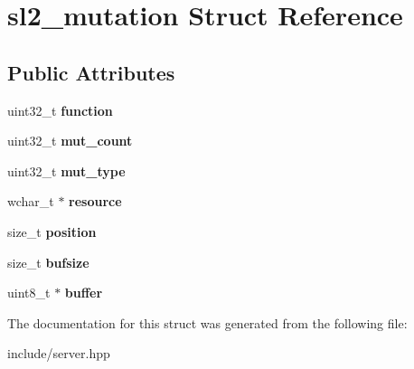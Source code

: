 \hypertarget{structsl2__mutation}{}\section{sl2\+\_\+mutation Struct Reference}
\label{structsl2__mutation}
\subsection*{Public Attributes}
\begin{DoxyCompactItemize}
\item 
\mbox{\label{structsl2__mutation_a2702591b883458044956d0fd7357dbb0}} 
uint32\+\_\+t {\bfseries function}
\item 
\mbox{\label{structsl2__mutation_a818bac10f2acdc255a77d73550c85be6}} 
uint32\+\_\+t {\bfseries mut\+\_\+count}
\item 
\mbox{\label{structsl2__mutation_a8a50b4afd10174068761d0b613693d90}} 
uint32\+\_\+t {\bfseries mut\+\_\+type}
\item 
\mbox{\label{structsl2__mutation_ab75e307b43c896734a3e62368abd2bd8}} 
wchar\+\_\+t $\ast$ {\bfseries resource}
\item 
\mbox{\label{structsl2__mutation_ad65eaee56029a8e145e0a79a164786e2}} 
size\+\_\+t {\bfseries position}
\item 
\mbox{\label{structsl2__mutation_a178b4918882d8cca48c56c493402109a}} 
size\+\_\+t {\bfseries bufsize}
\item 
\mbox{\label{structsl2__mutation_aea2ed4f8abfab387f10e4b4172f1fa48}} 
uint8\+\_\+t $\ast$ {\bfseries buffer}
\end{DoxyCompactItemize}


The documentation for this struct was generated from the following file\+:\begin{DoxyCompactItemize}
\item 
include/server.\+hpp\end{DoxyCompactItemize}
